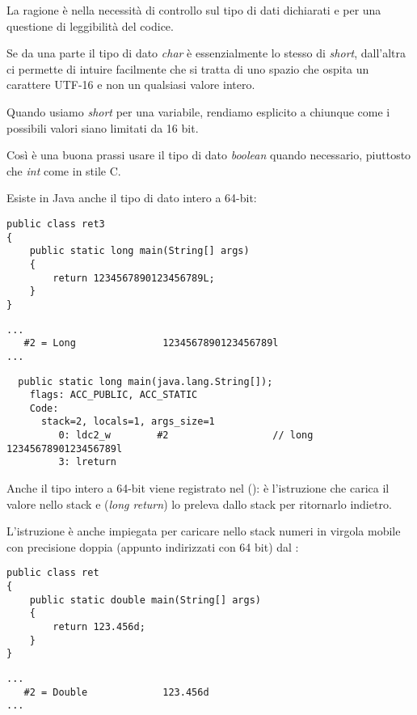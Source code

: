 La ragione è nella necessità di controllo sul tipo di dati dichiarati e per una questione di leggibilità del codice.

Se da una parte il tipo di dato \emph{char} è essenzialmente lo stesso di \emph{short}, dall'altra ci permette di intuire facilmente che si tratta
di uno spazio che ospita un carattere UTF-16 e non un qualsiasi valore intero.

Quando usiamo \emph{short} per una variabile, rendiamo esplicito a chiunque come i possibili valori siano limitati da 16 bit.

Così è una buona prassi usare il tipo di dato \emph{boolean} quando necessario,
piuttosto che \emph{int} come in stile C.

Esiste in Java anche il tipo di dato intero a 64-bit:

\begin{lstlisting}[style=customjava]
public class ret3
{
	public static long main(String[] args)
	{
		return 1234567890123456789L;
	}
}
\end{lstlisting}

\begin{lstlisting}[caption=Constant pool]
...
   #2 = Long               1234567890123456789l
...
\end{lstlisting}

\begin{lstlisting}
  public static long main(java.lang.String[]);
    flags: ACC_PUBLIC, ACC_STATIC
    Code:
      stack=2, locals=1, args_size=1
         0: ldc2_w        #2                  // long 1234567890123456789l
         3: lreturn
\end{lstlisting}

Anche il tipo intero a 64-bit viene registrato nel ():  è l'istruzione che 
carica il valore nello stack e  (\emph{long return}) lo preleva dallo stack per ritornarlo indietro.

L'istruzione  è anche impiegata per caricare nello stack numeri in virgola mobile con precisione doppia
(appunto indirizzati con 64 bit) dal :

\begin{lstlisting}[style=customjava]
public class ret
{
	public static double main(String[] args)
	{
		return 123.456d;
	}
}
\end{lstlisting}

\begin{lstlisting}[caption=Constant pool]
...
   #2 = Double             123.456d
...
\end{lstlisting}

